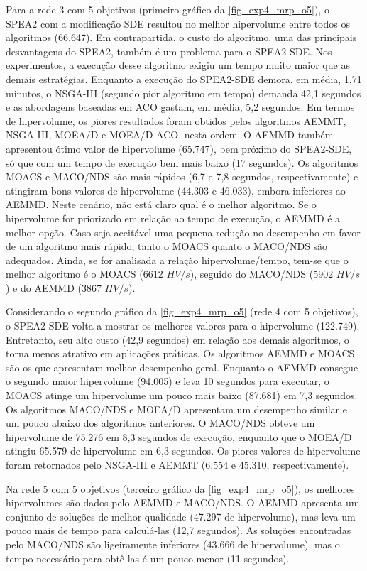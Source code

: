 Para a rede 3 com 5 objetivos (primeiro gráfico da \autoref{fig_exp4_mrp_o5}), o SPEA2 com a modificação SDE resultou no melhor hipervolume entre todos os algoritmos (66.647). Em contrapartida, o custo do algoritmo, uma das principais desvantagens do SPEA2, também é um problema para o SPEA2-SDE. Nos experimentos, a execução desse algoritmo exigiu um tempo muito maior que as demais estratégias. Enquanto a execução do SPEA2-SDE demora, em média, 1,71 minutos, o NSGA-III (segundo pior algoritmo em tempo) demanda 42,1 segundos e as abordagens baseadas em ACO gastam, em média, 5,2 segundos. Em termos de hipervolume, os piores resultados foram obtidos pelos algoritmos AEMMT, NSGA-III, MOEA/D e MOEA/D-ACO, nesta ordem. O AEMMD também apresentou ótimo valor de hipervolume (65.747), bem próximo do SPEA2-SDE, só que com um tempo de execução bem mais baixo (17 segundos). Os algoritmos MOACS e MACO/NDS são mais rápidos (6,7 e 7,8 segundos, respectivamente) e atingiram bons valores de hipervolume (44.303 e 46.033), embora inferiores ao AEMMD. Neste cenário, não está claro qual é o melhor algoritmo. Se o hipervolume for priorizado em relação ao tempo de execução, o AEMMD é a melhor opção. Caso seja aceitável uma pequena redução no desempenho em favor de um algoritmo mais rápido, tanto o MOACS quanto o MACO/NDS são adequados. Ainda, se for analisada a relação hipervolume/tempo, tem-se que o melhor algoritmo é o MOACS (6612 $HV/s$), seguido do MACO/NDS (5902 $HV/s$) e do AEMMD (3867 $HV/s$).

Considerando o segundo gráfico da \autoref{fig_exp4_mrp_o5} (rede 4 com 5 objetivos), o SPEA2-SDE volta a mostrar os melhores valores para o hipervolume (122.749). Entretanto, seu alto custo (42,9 segundos) em relação aos demais algoritmos, o torna menos atrativo em aplicações práticas. Os algoritmos AEMMD e MOACS são os que apresentam melhor desempenho geral. Enquanto o AEMMD consegue o segundo maior hipervolume (94.005) e leva 10 segundos para executar, o MOACS atinge um hipervolume um pouco mais baixo (87.681) em 7,3 segundos. Os algoritmos MACO/NDS e MOEA/D apresentam um desempenho similar e um pouco abaixo dos algoritmos anteriores. O MACO/NDS obteve um hipervolume de 75.276 em 8,3 segundos de execução, enquanto que o MOEA/D atingiu 65.579 de hipervolume em 6,3 segundos. Os piores valores de hipervolume foram retornados pelo NSGA-III e AEMMT (6.554 e 45.310, respectivamente).

Na rede 5 com 5 objetivos (terceiro gráfico da \autoref{fig_exp4_mrp_o5}), os melhores hipervolumes são dados pelo AEMMD e MACO/NDS. O AEMMD apresenta um conjunto de soluções de melhor qualidade (47.297 de hipervolume), mas leva um pouco mais de tempo para calculá-las (12,7 segundos). As soluções encontradas pelo MACO/NDS são ligeiramente inferiores (43.666 de hipervolume), mas o tempo necessário para obtê-las é um pouco menor (11 segundos).

